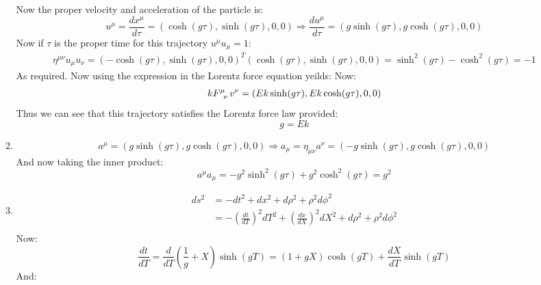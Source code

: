 \documentclass[12pt,a4]{article}
\begin{document}
\begin{enumerate}
\begin{enumerate}
        Now the proper velocity and acceleration of the particle is:
        \begin{equation*}
          u^\mu = \frac{d x^\mu}{d \tau} = (\cosh(g \tau), \sinh(g \tau), 0, 0) \Rightarrow \frac{d u^\mu}{d \tau} = (g \sinh(g \tau), g\cosh(g \tau), 0, 0)
        \end{equation*}
        Now if $\tau$ is the proper time for this trajectory $u^\mu u_\mu  = 1$:
        \begin{align*}
          \eta^{\mu\nu}u_\mu u_\nu = (-\cosh(g \tau), \sinh(g \tau), 0, 0)^T (\cosh(g \tau), \sinh(g \tau), 0, 0) = \sinh^2(g\tau) - \cosh^2(g \tau) = -1
        \end{align*}
        As required.
        Now using the expression in the Lorentz force equation yeilds:
        Now:
        \begin{align*}
          k\tensor{F}{^\mu_\nu}v^\nu = (Ek\sinh(g \tau), Ek\cosh(g \tau), 0, 0)
        \end{align*}
        Thus we can see that this trajectory satisfies the Lorentz force law provided:
        \begin{equation*}
          g = Ek
        \end{equation*}
      \item
        \begin{equation*}
          a^\mu = (g \sinh(g \tau), g\cosh(g \tau), 0, 0) \Rightarrow a_\mu = \eta_{\mu\nu}a^\nu = (-g \sinh(g \tau), g\cosh(g \tau), 0, 0)
        \end{equation*}
        And now taking the inner product:
        \begin{equation*}
          a^\mu a_\mu = -g^2 \sinh^2(g \tau) + g^2\cosh^2(g \tau) = g^2
        \end{equation*}
      \item 
        \begin{align*}
          ds^2 &= -dt^2 + dx^2 + d\rho^2 + \rho^2d\phi^2\\
               &= -\left(\frac{dt}{dT}\right)^2dT^2 + \left(\frac{dx}{dX}\right)^2 dX^2 + d\rho^2 + \rho^2d\phi^2\\
        \end{align*}
        Now:
        \begin{equation*}
          \frac{d t}{dT} = \frac{d}{dT} \left(\frac{1}{g} + X\right) \sinh(gT) = \left(1 + gX\right) \cosh(gT) + \frac{d X}{dT} \sinh(gT)
        \end{equation*}
        And:
        \begin{equation*}

\end{equation*}
\end{enumerate}
\end{enumerate}
\end{document}

